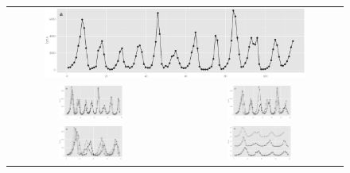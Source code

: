 \documentclass[12pt]{article}
\begin{document}

\begin{figure}[htp]
\begin{center}
\begin{tabular}{cc}
\multicolumn{2}{c}{\includegraphics[width=0.8\textwidth]{graph/pipeline-16-original}}\\
\includegraphics[width=0.4\textwidth]{graph/pipeline-16-1} &
\includegraphics[width=0.4\textwidth]{graph/pipeline-16-2} \\
\includegraphics[width=0.4\textwidth]{graph/pipeline-16-xwrap} &
\includegraphics[width=0.4\textwidth]{graph/pipeline-16-xwrap-facet} \\

\end{tabular}
\end{center}
\end{figure}
\end{document}
